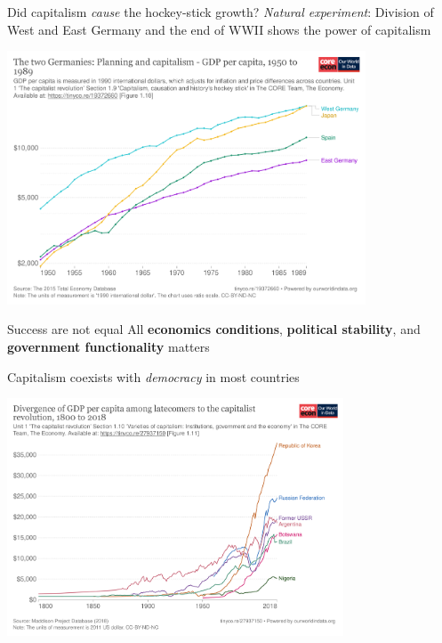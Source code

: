 \documentclass[11pt,aspectratio=43,usenames,dvipsnames]{beamer}
\theoremstyle{definition}
\begin{document}
\begin{frame}{Did capitalism \textit{cause} the hockey-stick growth?}
\label{slide:Did_capitalism__textit_cause__the_hockey_stick_growth_}
\textit{Natural experiment}: Division of West and East Germany and the end of WWII shows the power of capitalism \href{https://tinyco.re/19372660}{}

    \begin{center}
        \includegraphics[width=0.8\textwidth]{./figures/the-two-germanies-planning-and-capitalism.png}
    \end{center}
\end{frame}

\begin{frame}{Success are not equal}
\label{slide:Success_are_not_equal}
    All \textbf{economics conditions}, \textbf{political stability}, and \textbf{government functionality} matters

    Capitalism coexists with \textit{democracy} in most countries
    \begin{center}
        \includegraphics[width=0.75\textwidth]{./figures/divergence-of-gdp-per-capita-among-latecomers-to-the-capitalist-revolution-18002016.png}
    \end{center}
\end{frame}
\end{document}
